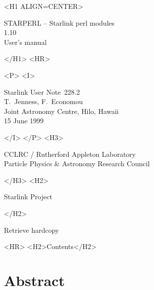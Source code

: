 \documentclass[twoside,11pt]{article}
\newcommand{\stardoccategory}  {Starlink User Note}
\newcommand{\stardocsource}    {sun\stardocnumber}
\newcommand{\stardocnumber}    {228.2}
\newcommand{\stardocauthors}   {T.\ Jenness, F.\ Economou\\
                                Joint Astronomy Centre, Hilo, Hawaii}
\newcommand{\stardocdate}      {15 June 1999}
\newcommand{\stardoctitle}     {STARPERL -- Starlink perl modules}
\newcommand{\stardocversion}   {1.10}
\newcommand{\stardocmanual}    {User's manual}
\newcommand{\htmladdnormallink}[2]{#1}
\newcommand{\htmladdimg}[1]{}
\newcommand{\htmlref}[2]{#1}
\newcommand{\htmladdtonavigation}[1]{}
\newcommand{\xlabel}[1]{}
\renewcommand{\_}{\texttt{\symbol{95}}}
\begin{document}
\begin{htmlonly}
   \xlabel{}
   \begin{rawhtml} <H1 ALIGN=CENTER> \end{rawhtml}
      \stardoctitle\\
      \stardocversion\\
      \stardocmanual
   \begin{rawhtml} </H1> <HR> \end{rawhtml}


   \begin{rawhtml} <P> <I> \end{rawhtml}
   \stardoccategory\ \stardocnumber \\
   \stardocauthors \\
   \stardocdate
   \begin{rawhtml} </I> </P> <H3> \end{rawhtml}
      \htmladdnormallink{CCLRC}{http://www.cclrc.ac.uk} /
      \htmladdnormallink{Rutherford Appleton Laboratory}
                        {http://www.cclrc.ac.uk/ral} \\
      \htmladdnormallink{Particle Physics \& Astronomy Research Council}
                        {http://www.pparc.ac.uk} \\
   \begin{rawhtml} </H3> <H2> \end{rawhtml}
      \htmladdnormallink{Starlink Project}{http://star-www.rl.ac.uk/}
   \begin{rawhtml} </H2> \end{rawhtml}
   \htmladdnormallink{\htmladdimg{source.gif} Retrieve hardcopy}
      {http://star-www.rl.ac.uk/cgi-bin/hcserver?\stardocsource}\\

  \label{stardoccontents}
  \begin{rawhtml} 
    <HR>
    <H2>Contents</H2>
  \end{rawhtml}
  \htmladdtonavigation{\htmlref{\htmladdimg{contents_motif.gif}}
        {stardoccontents}}

  \section{\xlabel{abstract}Abstract}
\end{htmlonly}
\end{document}
